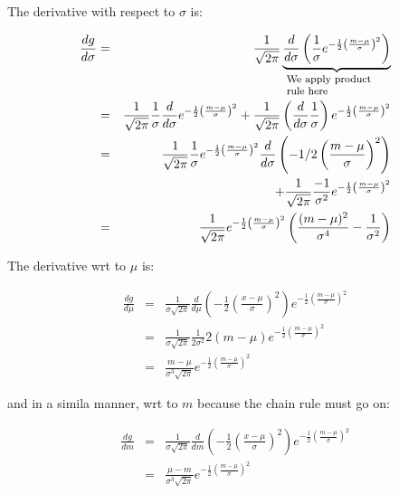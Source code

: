 \documentclass{article}
\newcommand{\explain}[2]{\underbrace{{#1}}_{\parbox{\widthof{\ensuremath{#1}}}{\footnotesize\raggedright #2}}}
\begin{document}

The derivative with respect to $\sigma$ is:

\begin{eqnarray}
	\frac{d g}{d \sigma}&=&\frac{1}{\sqrt{2 \pi}} \explain{\frac{d}{d \sigma}\left( \frac{1}{\sigma} e^{-\frac{1}{2} \left(\frac{m - \mu}{\sigma}\right)^2} \right)}{We apply product rule here}\\
	&=&\frac{1}{\sqrt{2 \pi}} \frac{1}{\sigma} \frac{d}{d \sigma} e^{-\frac{1}{2} \left(\frac{m - \mu}{\sigma}\right)^2}+
	\frac{1}{\sqrt{2 \pi}} \left( \frac{d}{d \sigma} \frac{1}{\sigma} \right) e^{-\frac{1}{2} \left(\frac{m - \mu}{\sigma}\right)^2}\\
	&=&\frac{1}{\sqrt{2 \pi}} \frac{1}{\sigma} e^{-\frac{1}{2} \left(\frac{m - \mu}{\sigma}\right)^2} \frac{d}{d \sigma} \left(-1/2 \left(\frac{m - \mu}{\sigma} \right)^2 \right) \nonumber \\&&+ \frac{1}{\sqrt{2 \pi}} \frac{-1}{\sigma^2} e^{-\frac{1}{2} \left(\frac{m - \mu}{\sigma}\right)^2}\\
	&=&\frac{1}{\sqrt{2 \pi}} e^{-\frac{1}{2} \left(\frac{m - \mu}{\sigma}\right)^2} \left( \frac{(m-\mu)^2}{\sigma^4}  - \frac{1}{\sigma ^2} \right)
\end{eqnarray}

The derivative wrt to $\mu$ is:

\begin{eqnarray}
	\frac{d g}{d \mu}&=&\frac{1}{\sigma \sqrt{2 \pi}}\frac{d}{d \mu}\left( -\frac{1}{2} \left(\frac{x-\mu}{\sigma}\right)^2 \right) e^{-\frac{1}{2} \left(\frac{m - \mu}{\sigma}\right)^2} \\
	&=&\frac{1}{\sigma \sqrt{2 \pi}} \frac{1}{2 \sigma ^2} 2 (m-\mu)  e^{-\frac{1}{2} \left(\frac{m - \mu}{\sigma}\right)^2}\\
	&=& \frac{m - \mu}{\sigma ^3 \sqrt{2 \pi}} e^{-\frac{1}{2} \left(\frac{m - \mu}{\sigma}\right)^2}
\end{eqnarray}	


and in a simila manner, wrt to $m$ because the chain rule must go on:

\begin{eqnarray}
	\frac{d g}{d m}&=&\frac{1}{\sigma \sqrt{2 \pi}}\frac{d}{d m}\left( -\frac{1}{2} \left(\frac{x-\mu}{\sigma}\right)^2 \right) e^{-\frac{1}{2} \left(\frac{m - \mu}{\sigma}\right)^2} \\
	&=& \frac{\mu-m}{\sigma ^3 \sqrt{2 \pi}} e^{-\frac{1}{2} \left(\frac{m - \mu}{\sigma}\right)^2}
\end{eqnarray}	
\end{document}
